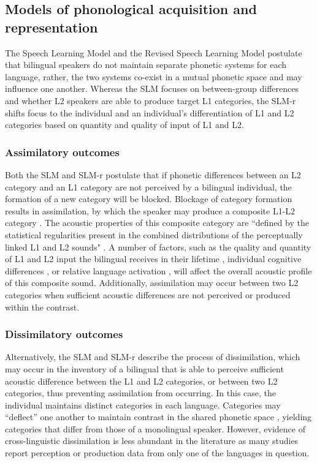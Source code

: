 \documentclass[output=paper,colorlinks,citecolor=brown,draftmode]{langscibook}
\begin{document}
\subsection{Models of phonological acquisition and representation}

The Speech Learning Model \citep[SLM;][]{flege1995second} and the Revised Speech Learning Model \citep[SLM-r;][]{flege2021revised} postulate that bilingual speakers do not maintain separate phonetic systems for each language, rather, the two systems co-exist in a mutual phonetic space and may influence one another. Whereas the SLM focuses on between-group differences and whether L2 speakers are able to produce target L1 categories, the SLM-r shifts focus to the individual and an individual's differentiation of L1 and L2 categories based on quantity and quality of input of L1 and L2.

\subsubsection{Assimilatory outcomes}

Both the SLM and SLM-r postulate that if phonetic differences between an L2 category and an L1 category are not perceived by a bilingual individual, the formation of a new category will be blocked. Blockage of category formation results in assimilation, by which the speaker may produce a composite L1-L2 category \citep{evans2007plasticity,kendall2012variation}. The acoustic properties of this composite category are ``defined by the statistical regularities present in the combined distributions of the perceptually linked L1 and L2 sounds" \citep[][41]{flege2021revised}. A number of factors, such as the quality and quantity of L1 and L2 input the bilingual receives in their lifetime  \citep{flege2002interactions,yeni2000pronunciation}, individual cognitive differences \citep{lev2013low}, or relative language activation \citep{grosjean2001bilingual}, will affect the overall acoustic profile of this composite sound. Additionally, assimilation may occur between two L2 categories when sufficient acoustic differences are not perceived or produced within the contrast.

\subsubsection{Dissimilatory outcomes}

Alternatively, the SLM and SLM-r describe the process of dissimilation, which may occur in the inventory of a bilingual that is able to perceive sufficient acoustic difference between the L1 and L2 categories, or between two L2 categories, thus preventing assimilation from occurring. In this case, the individual maintains  distinct categories in each language. Categories may ``deflect'' one another to maintain contrast in the shared phonetic space \citep{baker2005interaction,flege2021revised}, yielding categories that differ from those of a monolingual speaker. However, evidence of cross-linguistic dissimilation is less abundant in the literature as many studies report perception or production data from only one of the languages in question.
\end{document}
